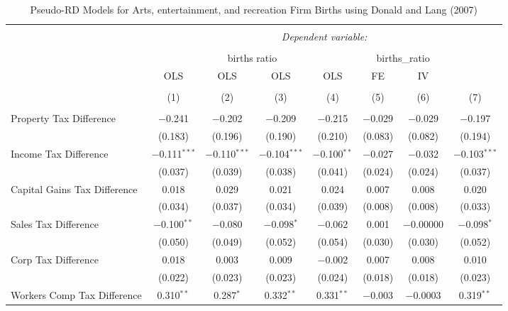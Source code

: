 
\begin{table}[!htbp] \centering 
  \caption{Pseudo-RD Models for  Arts, entertainment, and recreation Firm Births using Donald and Lang (2007)} 
  \label{} 
\begin{tabular}{@{\extracolsep{5pt}}lccccccc} 
\\[-1.8ex]\hline 
\hline \\[-1.8ex] 
 & \multicolumn{7}{c}{\textit{Dependent variable:}} \\ 
\cline{2-8} 
\\[-1.8ex] & \multicolumn{4}{c}{births ratio} & \multicolumn{2}{c}{births\_ratio} &   \\ 
 & OLS & OLS & OLS & OLS & FE & IV &  \\ 
\\[-1.8ex] & (1) & (2) & (3) & (4) & (5) & (6) & (7)\\ 
\hline \\[-1.8ex] 
 Property Tax Difference & $-$0.241 & $-$0.202 & $-$0.209 & $-$0.215 & $-$0.029 & $-$0.029 & $-$0.197 \\ 
  & (0.183) & (0.196) & (0.190) & (0.210) & (0.083) & (0.082) & (0.194) \\ 
  Income Tax Difference & $-$0.111$^{***}$ & $-$0.110$^{***}$ & $-$0.104$^{***}$ & $-$0.100$^{**}$ & $-$0.027 & $-$0.032 & $-$0.103$^{***}$ \\ 
  & (0.037) & (0.039) & (0.038) & (0.041) & (0.024) & (0.024) & (0.037) \\ 
  Capital Gains Tax Difference & 0.018 & 0.029 & 0.021 & 0.024 & 0.007 & 0.008 & 0.020 \\ 
  & (0.034) & (0.037) & (0.034) & (0.039) & (0.008) & (0.008) & (0.033) \\ 
  Sales Tax Difference & $-$0.100$^{**}$ & $-$0.080 & $-$0.098$^{*}$ & $-$0.062 & 0.001 & $-$0.00000 & $-$0.098$^{*}$ \\ 
  & (0.050) & (0.049) & (0.052) & (0.054) & (0.030) & (0.030) & (0.052) \\ 
  Corp Tax Difference & 0.018 & 0.003 & 0.009 & $-$0.002 & 0.007 & 0.008 & 0.010 \\ 
  & (0.022) & (0.023) & (0.023) & (0.024) & (0.018) & (0.018) & (0.023) \\ 
  Workers Comp Tax Difference & 0.310$^{**}$ & 0.287$^{*}$ & 0.332$^{**}$ & 0.331$^{**}$ & $-$0.003 & $-$0.0003 & 0.319$^{**}$ \\ 

\end{tabular}
\end{table}
